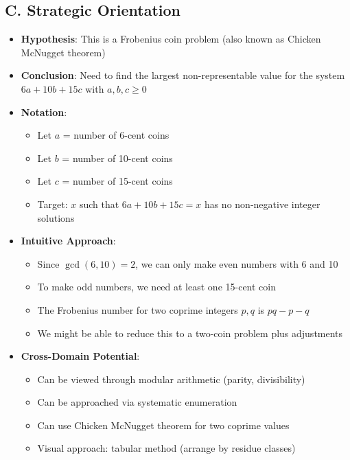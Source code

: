 \documentclass[12pt]{article}
\begin{document}
\begin{problemconfigbox}
\subsection*{C. Strategic Orientation}
\begin{itemize}[leftmargin=*]
    \item \textbf{Hypothesis}: This is a Frobenius coin problem (also known as Chicken McNugget theorem)
    \item \textbf{Conclusion}: Need to find the largest non-representable value for the system $6a + 10b + 15c$ with $a, b, c \geq 0$
    \item \textbf{Notation}: 
    \begin{itemize}
        \item Let $a$ = number of 6-cent coins
        \item Let $b$ = number of 10-cent coins
        \item Let $c$ = number of 15-cent coins
        \item Target: $x$ such that $6a + 10b + 15c = x$ has no non-negative integer solutions
    \end{itemize}
    \item \textbf{Intuitive Approach}: 
    \begin{itemize}
        \item Since $\gcd(6, 10) = 2$, we can only make even numbers with 6 and 10
        \item To make odd numbers, we need at least one 15-cent coin
        \item The Frobenius number for two coprime integers $p, q$ is $pq - p - q$
        \item We might be able to reduce this to a two-coin problem plus adjustments
    \end{itemize}
    \item \textbf{Cross-Domain Potential}: 
    \begin{itemize}
        \item Can be viewed through modular arithmetic (parity, divisibility)
        \item Can be approached via systematic enumeration
        \item Can use Chicken McNugget theorem for two coprime values
        \item Visual approach: tabular method (arrange by residue classes)
    \end{itemize}
\end{itemize}
\end{problemconfigbox}
\end{document}
